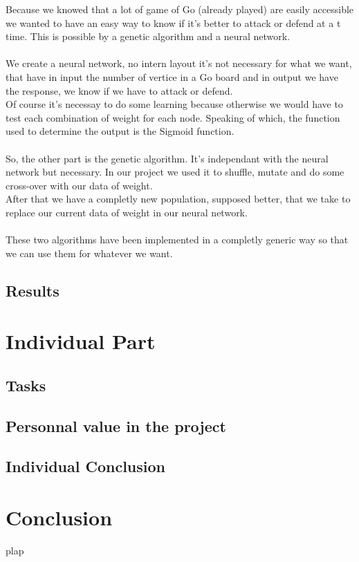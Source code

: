 Because we knowed that a lot of game of Go (already played) are easily
accessible we wanted to have an easy way to know if it's better to attack or
defend at a t time. This is possible by a genetic algorithm and a neural
network.\\
\\
We create a neural network, no intern layout it's not necessary for what we
want, that have in input the number of vertice in a Go board and in output we
have the response, we know if we have to attack or defend.\\
Of course it's necessay to do some learning because otherwise we would have to
test each combination of weight for each node. Speaking of which, the function
used to determine the output is the Sigmoid function.\\
\\
So, the other part is the genetic algorithm. It's independant with the
neural network but necessary. In our project we used it to shuffle, mutate and
do some cross-over with our data of weight.\\
After that we have a completly new population, supposed better, that we take to
replace our current data of weight in our neural network.\\
\\
These two algorithms have been implemented in a completly generic way so that we
can use them for whatever we want.\\

\section{Results}

\chapter{Individual Part}

\section{Tasks}

\section{Personnal value in the project}

\section{Individual Conclusion}

\chapter*{Conclusion}
plap



